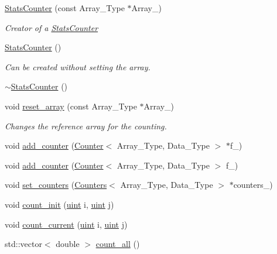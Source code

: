 \begin{DoxyCompactItemize}
\item 
\hyperlink{classbarry_1_1_stats_counter_a43e9fa90ef0b1fb716f0e75d1b803ef1}{Stats\+Counter} (const Array\+\_\+\+Type $\ast$Array\+\_\+)
\begin{DoxyCompactList}\small\item\em Creator of a {\ttfamily \hyperlink{classbarry_1_1_stats_counter}{Stats\+Counter}} \end{DoxyCompactList}\item 
\hyperlink{classbarry_1_1_stats_counter_a407df1580b207faac92c476c7062b840}{Stats\+Counter} ()
\begin{DoxyCompactList}\small\item\em Can be created without setting the array. \end{DoxyCompactList}\item 
\hyperlink{classbarry_1_1_stats_counter_a2824d86765d94e909e4b33396250b6c7}{$\sim$\+Stats\+Counter} ()
\item 
void \hyperlink{classbarry_1_1_stats_counter_a8dabc3a7a9931acbb76900a67d728f70}{reset\+\_\+array} (const Array\+\_\+\+Type $\ast$Array\+\_\+)
\begin{DoxyCompactList}\small\item\em Changes the reference array for the counting. \end{DoxyCompactList}\item 
void \hyperlink{classbarry_1_1_stats_counter_a829e41243a7b18cf71337deeec9f7030}{add\+\_\+counter} (\hyperlink{classbarry_1_1_counter}{Counter}$<$ Array\+\_\+\+Type, Data\+\_\+\+Type $>$ $\ast$f\+\_\+)
\item 
void \hyperlink{classbarry_1_1_stats_counter_ad175dcd2bd30d017881783de546ac333}{add\+\_\+counter} (\hyperlink{classbarry_1_1_counter}{Counter}$<$ Array\+\_\+\+Type, Data\+\_\+\+Type $>$ f\+\_\+)
\item 
void \hyperlink{classbarry_1_1_stats_counter_a1d66f7d7326cac60a46ee56a8eb0a497}{set\+\_\+counters} (\hyperlink{classbarry_1_1_counters}{Counters}$<$ Array\+\_\+\+Type, Data\+\_\+\+Type $>$ $\ast$counters\+\_\+)
\item 
void \hyperlink{classbarry_1_1_stats_counter_a19bd5936619e190c0d8918b4f343922e}{count\+\_\+init} (\hyperlink{namespacebarry_a11dfc53ddb4672278319aa04f1e09a6c}{uint} i, \hyperlink{namespacebarry_a11dfc53ddb4672278319aa04f1e09a6c}{uint} j)
\item 
void \hyperlink{classbarry_1_1_stats_counter_ab81166f7cb67eeaecc469016d237019a}{count\+\_\+current} (\hyperlink{namespacebarry_a11dfc53ddb4672278319aa04f1e09a6c}{uint} i, \hyperlink{namespacebarry_a11dfc53ddb4672278319aa04f1e09a6c}{uint} j)
\item 
std\+::vector$<$ double $>$ \hyperlink{classbarry_1_1_stats_counter_a83bd92031a1499109c98f238221cbd67}{count\+\_\+all} ()
\end{DoxyCompactItemize}
